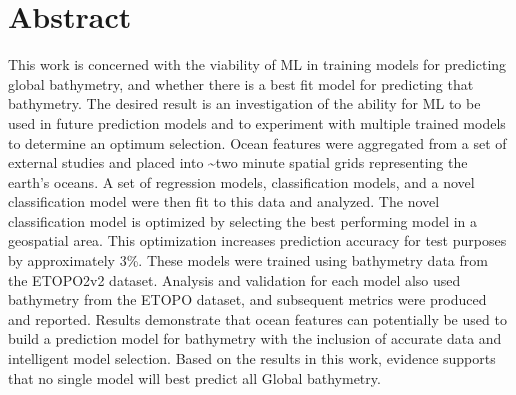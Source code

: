 \section{Abstract}
\setlength{\parindent}{10ex}
This work is concerned with the viability of \ac{ML} in training models for predicting global bathymetry, and whether there is a best fit model for predicting that bathymetry.
The desired result is an investigation of the ability for \ac{ML} to be used in future prediction models and to experiment with multiple trained models to determine an optimum selection.
Ocean features were aggregated from a set of external studies and placed into \~{}two minute spatial grids representing the earth's oceans.
A set of regression models, classification models, and a novel classification model were then fit to this data and analyzed.
The novel classification model is optimized by selecting the best performing model in a geospatial area.
This optimization increases prediction accuracy for test purposes by approximately 3\%.
These models were trained using bathymetry data from the ETOPO2v2 dataset.
Analysis and validation for each model also used bathymetry from the ETOPO dataset, and subsequent metrics were produced and reported.
Results demonstrate that ocean features can potentially be used to build a prediction model for bathymetry with the inclusion of accurate data and intelligent model selection.
Based on the results in this work, evidence supports that no single model will best predict all Global bathymetry.
